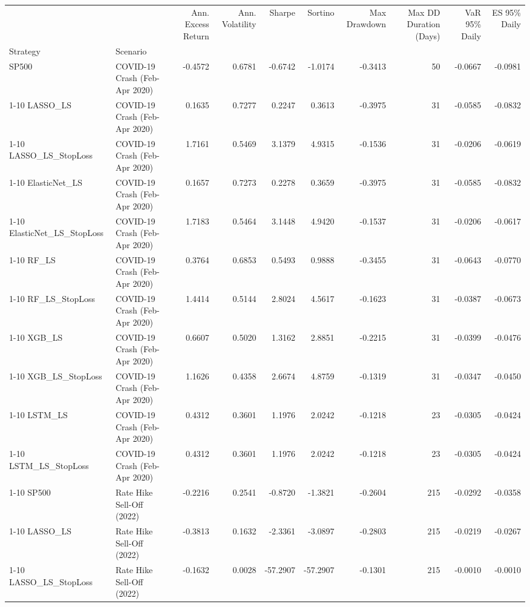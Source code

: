 \begin{tabular}{llrrrrrrrr}
\toprule
 &  & Ann. Excess Return & Ann. Volatility & Sharpe & Sortino & Max Drawdown & Max DD Duration (Days) & VaR 95\% Daily & ES 95\% Daily \\
Strategy & Scenario &  &  &  &  &  &  &  &  \\
\midrule
SP500 & COVID-19 Crash (Feb-Apr 2020) & -0.4572 & 0.6781 & -0.6742 & -1.0174 & -0.3413 & 50 & -0.0667 & -0.0981 \\
\cline{1-10}
LASSO\_LS & COVID-19 Crash (Feb-Apr 2020) & 0.1635 & 0.7277 & 0.2247 & 0.3613 & -0.3975 & 31 & -0.0585 & -0.0832 \\
\cline{1-10}
LASSO\_LS\_StopLoss & COVID-19 Crash (Feb-Apr 2020) & 1.7161 & 0.5469 & 3.1379 & 4.9315 & -0.1536 & 31 & -0.0206 & -0.0619 \\
\cline{1-10}
ElasticNet\_LS & COVID-19 Crash (Feb-Apr 2020) & 0.1657 & 0.7273 & 0.2278 & 0.3659 & -0.3975 & 31 & -0.0585 & -0.0832 \\
\cline{1-10}
ElasticNet\_LS\_StopLoss & COVID-19 Crash (Feb-Apr 2020) & 1.7183 & 0.5464 & 3.1448 & 4.9420 & -0.1537 & 31 & -0.0206 & -0.0617 \\
\cline{1-10}
RF\_LS & COVID-19 Crash (Feb-Apr 2020) & 0.3764 & 0.6853 & 0.5493 & 0.9888 & -0.3455 & 31 & -0.0643 & -0.0770 \\
\cline{1-10}
RF\_LS\_StopLoss & COVID-19 Crash (Feb-Apr 2020) & 1.4414 & 0.5144 & 2.8024 & 4.5617 & -0.1623 & 31 & -0.0387 & -0.0673 \\
\cline{1-10}
XGB\_LS & COVID-19 Crash (Feb-Apr 2020) & 0.6607 & 0.5020 & 1.3162 & 2.8851 & -0.2215 & 31 & -0.0399 & -0.0476 \\
\cline{1-10}
XGB\_LS\_StopLoss & COVID-19 Crash (Feb-Apr 2020) & 1.1626 & 0.4358 & 2.6674 & 4.8759 & -0.1319 & 31 & -0.0347 & -0.0450 \\
\cline{1-10}
LSTM\_LS & COVID-19 Crash (Feb-Apr 2020) & 0.4312 & 0.3601 & 1.1976 & 2.0242 & -0.1218 & 23 & -0.0305 & -0.0424 \\
\cline{1-10}
LSTM\_LS\_StopLoss & COVID-19 Crash (Feb-Apr 2020) & 0.4312 & 0.3601 & 1.1976 & 2.0242 & -0.1218 & 23 & -0.0305 & -0.0424 \\
\cline{1-10}
SP500 & Rate Hike Sell-Off (2022) & -0.2216 & 0.2541 & -0.8720 & -1.3821 & -0.2604 & 215 & -0.0292 & -0.0358 \\
\cline{1-10}
LASSO\_LS & Rate Hike Sell-Off (2022) & -0.3813 & 0.1632 & -2.3361 & -3.0897 & -0.2803 & 215 & -0.0219 & -0.0267 \\
\cline{1-10}
LASSO\_LS\_StopLoss & Rate Hike Sell-Off (2022) & -0.1632 & 0.0028 & -57.2907 & -57.2907 & -0.1301 & 215 & -0.0010 & -0.0010 \\

\end{tabular}

